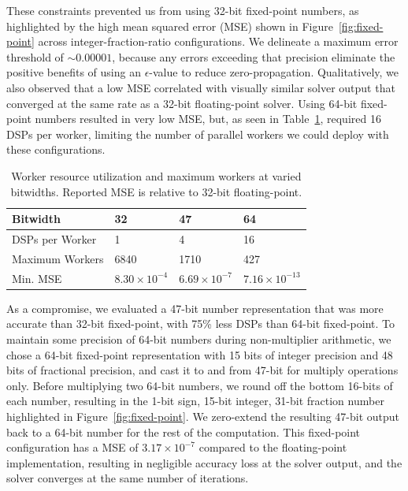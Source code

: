 These constraints prevented us from using 32-bit fixed-point numbers, as highlighted by the high mean squared error (MSE) shown in Figure~\ref{fig:fixed-point} across integer-fraction-ratio configurations.
We delineate a maximum error threshold of $\sim 0.00001$, because any errors exceeding that precision eliminate the positive benefits of using an $\epsilon$-value to reduce zero-propagation.
Qualitatively, we also observed that a low MSE correlated with visually similar solver output that converged at the same rate as a 32-bit floating-point solver.
Using 64-bit fixed-point numbers resulted in very low MSE, but, as seen in Table~\ref{table:dsp-workers}, required 16 DSPs per worker, limiting the number of parallel workers we could deploy with these configurations.


\begin{table}[h]
  \centering
  \caption{Worker resource utilization and maximum workers at varied bitwidths. Reported MSE is relative to 32-bit floating-point.}

  \begin{tabular}{l|lll}
  \toprule
  Bitwidth        & 32                   & 47                    & 64                   \\ \midrule
  DSPs per Worker & 1                    & 4                     & 16                   \\
  Maximum Workers & 6840                  & 1710                    & 427                   \\
  Min. MSE        & $8.30\times 10^{-4}$ &  $6.69\times 10^{-7}$  & $7.16\times 10^{-13}$ \\ \bottomrule
  \end{tabular}
  \label{table:dsp-workers}


\end{table}


As a compromise, we evaluated a 47-bit number representation that was more accurate than 32-bit fixed-point, with 75\% less DSPs than 64-bit fixed-point.
To maintain some precision of 64-bit numbers during non-multiplier arithmetic, we chose a 64-bit fixed-point representation with 15 bits of integer precision and 48 bits of fractional precision, and cast it to and from 47-bit for multiply operations only.
Before multiplying two 64-bit numbers, we round off the bottom 16-bits of each number, resulting in the 1-bit sign, 15-bit integer, 31-bit fraction number highlighted in Figure~\ref{fig:fixed-point}.
We zero-extend the resulting 47-bit output back to a 64-bit number for the rest of the computation.
This fixed-point configuration has a MSE of $3.17\times10^{-7}$ compared to the floating-point implementation, resulting in negligible accuracy loss at the solver output, and the solver converges at the same number of iterations.


